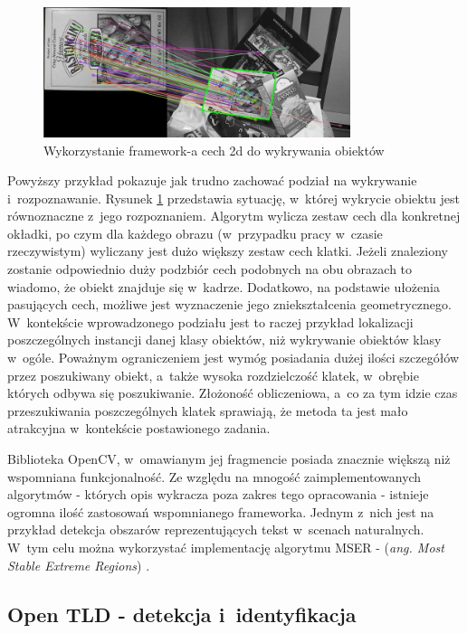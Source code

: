 \begin{figure}[h!]
  \centering
  \includegraphics[width=0.8\textwidth]{img/rev_features2d_detection}
  \caption{Wykorzystanie framework-a cech 2d do wykrywania obiektów}
  \label{fig:rev_features2d_detection}
\end{figure}

Powyższy przykład pokazuje jak trudno zachować podział na wykrywanie
i~rozpoznawanie. Rysunek \ref{fig:rev_features2d_detection}
przedstawia sytuację, w~której wykrycie obiektu jest równoznaczne
z~jego rozpoznaniem.
Algorytm wylicza zestaw cech dla konkretnej okładki, po czym dla każdego
obrazu (w~przypadku pracy w~czasie rzeczywistym) wyliczany
jest dużo większy zestaw cech klatki. Jeżeli znaleziony zostanie
odpowiednio duży podzbiór cech podobnych na obu obrazach to wiadomo,
że obiekt znajduje się w~kadrze.
Dodatkowo, na podstawie ułożenia pasujących cech, możliwe jest
wyznaczenie jego zniekształcenia geometrycznego. W~kontekście wprowadzonego
podziału jest to raczej przykład lokalizacji poszczególnych instancji danej
klasy obiektów, niż wykrywanie obiektów klasy w~ogóle.
Poważnym
ograniczeniem jest wymóg posiadania dużej ilości szczegółów przez 
poszukiwany
obiekt, a~także wysoka rozdzielczość klatek, w~obrębie których odbywa się
poszukiwanie. Złożoność obliczeniowa, a~co za tym idzie czas przeszukiwania
poszczególnych klatek sprawiają, że metoda ta jest mało atrakcyjna w~kontekście
postawionego zadania.

Biblioteka OpenCV, w~omawianym jej fragmencie posiada znacznie
większą niż wspomniana funkcjonalność.
Ze względu na mnogość zaimplementowanych algorytmów - których opis
wykracza poza zakres tego opracowania - istnieje ogromna ilość
zastosowań wspomnianego frameworka. Jednym z~nich jest na przykład
detekcja obszarów
reprezentujących tekst w~scenach naturalnych. W~tym celu
można wykorzystać implementację algorytmu MSER - (\textit{ang. Most
Stable Extreme Regions}) \cite{OCV:MSER}.

\subsection{Open TLD - detekcja i~identyfikacja}


